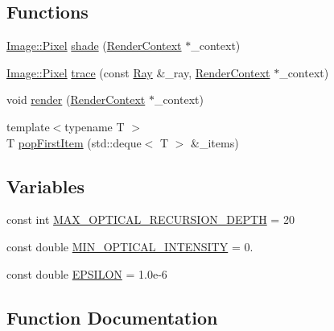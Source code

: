 \subsection*{Functions}
\begin{DoxyCompactItemize}
\item 
\hyperlink{structImage_1_1Pixel}{Image\+::\+Pixel} \hyperlink{namespaceRenderer_a5889ab8316b510a8dc208452fc14a76c}{shade} (\hyperlink{structRenderer_1_1RenderContext}{Render\+Context} $\ast$\+\_\+context)
\item 
\hyperlink{structImage_1_1Pixel}{Image\+::\+Pixel} \hyperlink{namespaceRenderer_ac12ecacae721953493f903dacb4d411a}{trace} (const \hyperlink{structRenderer_1_1Ray}{Ray} \&\+\_\+ray, \hyperlink{structRenderer_1_1RenderContext}{Render\+Context} $\ast$\+\_\+context)
\item 
void \hyperlink{namespaceRenderer_ab4e56fa4911b200479ea79e6f43079d0}{render} (\hyperlink{structRenderer_1_1RenderContext}{Render\+Context} $\ast$\+\_\+context)
\item 
{\footnotesize template$<$typename T $>$ }\\T \hyperlink{namespaceRenderer_aa6ee81d879eb80bd4242817e9052b9bc}{pop\+First\+Item} (std\+::deque$<$ T $>$ \&\+\_\+items)
\end{DoxyCompactItemize}
\subsection*{Variables}
\begin{DoxyCompactItemize}
\item 
const int \hyperlink{namespaceRenderer_a5c15206bdfc218143abbf8d7c82364d8}{M\+A\+X\+\_\+\+O\+P\+T\+I\+C\+A\+L\+\_\+\+R\+E\+C\+U\+R\+S\+I\+O\+N\+\_\+\+D\+E\+P\+T\+H} = 20
\item 
const double \hyperlink{namespaceRenderer_a339b0f77ed41f9ed0c49e705e5249345}{M\+I\+N\+\_\+\+O\+P\+T\+I\+C\+A\+L\+\_\+\+I\+N\+T\+E\+N\+S\+I\+T\+Y} = 0.
\item 
const double \hyperlink{namespaceRenderer_ad0639ed60b8a49b3a6b0526def7f1bb2}{E\+P\+S\+I\+L\+O\+N} = 1.\+0e-\/6
\end{DoxyCompactItemize}


\subsection{Function Documentation}
\hypertarget{namespaceRenderer_aa6ee81d879eb80bd4242817e9052b9bc}{}
